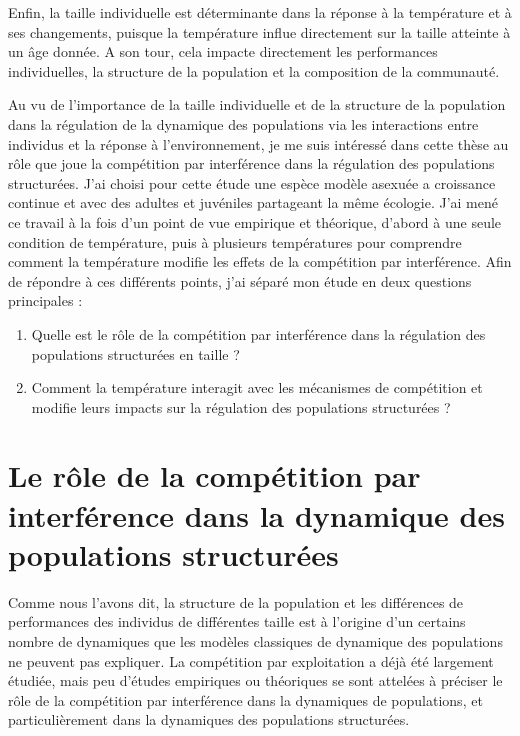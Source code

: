 Enfin, la taille individuelle est déterminante dans la réponse à la température
et à ses changements, puisque la température influe directement sur la taille
atteinte à un âge donnée. A son tour, cela impacte directement les performances
individuelles, la structure de la population et la composition de la communauté. 

Au vu de l'importance de la taille individuelle et de la structure de la
population dans la régulation de la dynamique des populations via les
interactions entre individus et la réponse à l'environnement, je me suis
intéressé dans cette thèse au rôle que joue la compétition par interférence dans
la régulation des populations structurées.  J'ai choisi pour cette étude une espèce
modèle asexuée a croissance continue et avec des adultes et juvéniles
partageant la même écologie. J'ai mené ce travail à la fois d'un
point de vue empirique et théorique, d'abord à une seule condition de température, puis à plusieurs
températures pour comprendre comment la température modifie les effets de la
compétition par interférence. Afin de répondre à ces différents points, j'ai
séparé mon étude en deux questions principales :
\begin{enumerate}
  \item Quelle est le rôle de la compétition par interférence dans la régulation
  des populations structurées en taille ?
  \item Comment la température interagit avec les mécanismes de compétition et
  modifie leurs impacts sur la régulation des populations structurées ?
\end{enumerate}

\section{Le rôle de la compétition par interférence dans la dynamique des
populations structurées}

Comme nous l'avons dit, la structure de la population et les différences de
performances des individus de différentes taille est à l'origine d'un certains
nombre de dynamiques que les modèles classiques de dynamique des populations ne
peuvent pas expliquer. La compétition par exploitation a déjà été largement
étudiée, mais peu d'études empiriques ou théoriques se sont attelées à préciser
le rôle de la compétition par interférence dans la dynamiques de populations, et
particulièrement dans la dynamiques des populations structurées.

